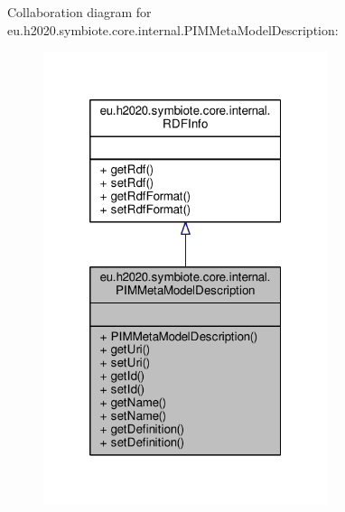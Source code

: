 Collaboration diagram for eu.\+h2020.\+symbiote.\+core.\+internal.\+P\+I\+M\+Meta\+Model\+Description\+:\nopagebreak
\begin{figure}[H]
\begin{center}
\leavevmode
\includegraphics[width=236pt]{classeu_1_1h2020_1_1symbiote_1_1core_1_1internal_1_1PIMMetaModelDescription__coll__graph}
\end{center}
\end{figure}
